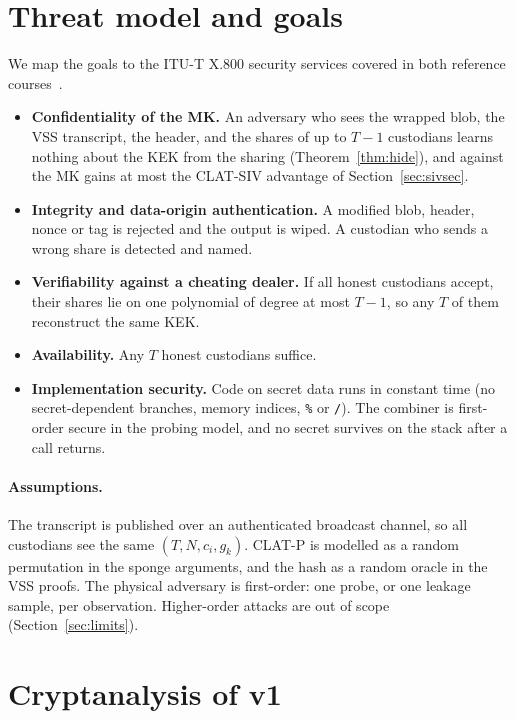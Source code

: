 \documentclass[10pt,a4paper]{article}
\newcommand{\code}[1]{\texttt{#1}}
\theoremstyle{definition}
\theoremstyle{remark}
\begin{document}
\section{Threat model and goals}\label{sec:threat}

We map the goals to the ITU-T X.800 security services covered in both reference courses~\cite{neso,paarlectures}.

\begin{itemize}
  \item \textbf{Confidentiality of the MK.} An adversary who sees the wrapped blob, the VSS transcript, the header, and the shares of up to $T-1$ custodians learns nothing about the KEK from the sharing (Theorem~\ref{thm:hide}), and against the MK gains at most the CLAT-SIV advantage of Section~\ref{sec:sivsec}.
  \item \textbf{Integrity and data-origin authentication.} A modified blob, header, nonce or tag is rejected and the output is wiped. A custodian who sends a wrong share is detected and named.
  \item \textbf{Verifiability against a cheating dealer.} If all honest custodians accept, their shares lie on one polynomial of degree at most $T-1$, so any $T$ of them reconstruct the same KEK.
  \item \textbf{Availability.} Any $T$ honest custodians suffice.
  \item \textbf{Implementation security.} Code on secret data runs in constant time (no secret-dependent branches, memory indices, \code{\%} or \code{/}). The combiner is first-order secure in the probing model, and no secret survives on the stack after a call returns.
\end{itemize}

\paragraph{Assumptions.}
The transcript is published over an authenticated broadcast channel, so all custodians see the same $(T, N, c_i, g_k)$. CLAT-P is modelled as a random permutation in the sponge arguments, and the hash as a random oracle in the VSS proofs. The physical adversary is first-order: one probe, or one leakage sample, per observation. Higher-order attacks are out of scope (Section~\ref{sec:limits}).

\section{Cryptanalysis of v1}\label{sec:v1}
\end{document}
